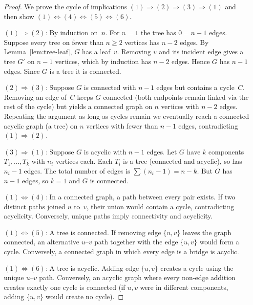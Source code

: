 \documentclass[12pt,a4paper,openany]{book}
\theoremstyle{definition}
\theoremstyle{plain}
\theoremstyle{remark}
\begin{document}
\begin{proof}
We prove the cycle of implications
$(1)\!\Rightarrow\!(2)\!\Rightarrow\!(3)\!\Rightarrow\!(1)$ and then
show $(1)\!\Leftrightarrow\!(4)\!\Leftrightarrow\!(5)
\!\Leftrightarrow\!(6)$.

\medskip\noindent
$(1)\Rightarrow(2)$:\; By induction on~$n$.  For $n=1$ the tree has
$0=n-1$ edges.  Suppose every tree on fewer than $n\ge 2$ vertices has
$n-2$ edges.  By Lemma~\ref{lem:tree-leaf}, $G$ has a leaf~$v$.
Removing $v$ and its incident edge gives a tree $G'$ on $n-1$ vertices,
which by induction has $n-2$ edges.  Hence $G$ has $n-1$ edges.
Since $G$ is a tree it is connected.

\medskip\noindent
$(2)\Rightarrow(3)$:\; Suppose $G$ is connected with $n-1$ edges but
contains a cycle~$C$.  Removing an edge of~$C$ keeps $G$ connected
(both endpoints remain linked via the rest of the cycle) but yields a
connected graph on $n$ vertices with $n-2$ edges.  Repeating the
argument as long as cycles remain we eventually reach a connected
acyclic graph (a tree) on $n$ vertices with fewer than $n-1$ edges,
contradicting $(1)\Rightarrow(2)$.

\medskip\noindent
$(3)\Rightarrow(1)$:\; Suppose $G$ is acyclic with $n-1$ edges.  Let
$G$ have $k$ components $T_1,\dots,T_k$ with $n_i$ vertices each.
Each $T_i$ is a tree (connected and acyclic), so has $n_i-1$ edges.
The total number of edges is $\sum(n_i-1)=n-k$.  But $G$ has $n-1$
edges, so $k=1$ and $G$ is connected.

\medskip\noindent
$(1)\Leftrightarrow(4)$:\; In a connected graph, a path between every
pair exists.  If two distinct paths joined $u$ to~$v$, their union
would contain a cycle, contradicting acyclicity.  Conversely, unique
paths imply connectivity and acyclicity.

\medskip\noindent
$(1)\Leftrightarrow(5)$:\; A tree is connected.  If removing edge
$\{u,v\}$ leaves the graph connected, an alternative $u$--$v$ path
together with the edge $\{u,v\}$ would form a cycle.  Conversely, a
connected graph in which every edge is a bridge is acyclic.

\medskip\noindent
$(1)\Leftrightarrow(6)$:\; A tree is acyclic.  Adding edge $\{u,v\}$
creates a cycle using the unique $u$--$v$ path.  Conversely, an acyclic
graph where every non-edge addition creates exactly one cycle is
connected (if $u,v$ were in different components, adding $\{u,v\}$
would create no cycle).
\end{proof}
\end{document}
